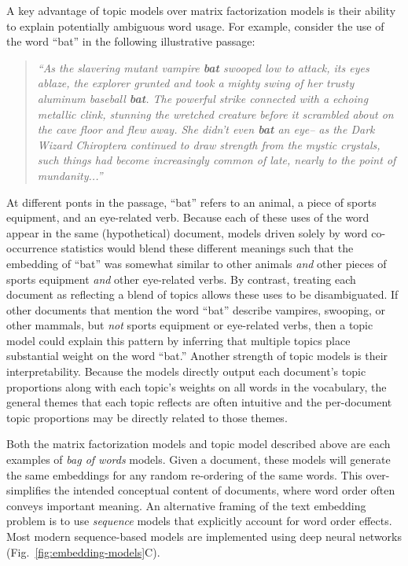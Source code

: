 \documentclass{article}
\begin{document}
A key advantage of topic models over matrix factorization models is their ability to explain potentially ambiguous word usage.  For example, consider the use of the word ``bat'' in the following illustrative passage:
\begin{quote}
  \textit{``As the slavering mutant vampire \textbf{bat} swooped low to attack, its eyes ablaze, the explorer grunted and took a mighty swing of her trusty aluminum baseball \textbf{bat}.  The powerful strike connected with a echoing metallic \textit{clink}, stunning the wretched creature before it scrambled about on the cave floor and flew away.  She didn't even \textbf{bat} an eye-- as the Dark Wizard Chiroptera continued to draw strength from the mystic crystals, such things had become increasingly common of late, nearly to the point of mundanity...''}
  \end{quote}
At different ponts in the passage, ``bat'' refers to an animal, a piece of sports equipment, and an eye-related verb.  Because each of these uses of the word appear in the same (hypothetical) document, models driven solely by word co-occurrence statistics would blend these different meanings such that the embedding of ``bat'' was somewhat similar to other animals \textit{and} other pieces of sports equipment \textit{and} other eye-related verbs.  By contrast, treating each document as reflecting a blend of topics allows these uses to be disambiguated.  If other documents that mention the word ``bat'' describe vampires, swooping, or other mammals, but \textit{not} sports equipment or eye-related verbs, then a topic model could explain this pattern by inferring that multiple topics place substantial weight on the word ``bat.''  Another strength of topic models is their interpretability.  Because the models directly output each document's topic proportions along with each topic's weights on all words in the vocabulary, the general themes that each topic reflects are often intuitive and the per-document topic proportions may be directly related to those themes.

Both the matrix factorization models and topic model described above are each examples of \textit{bag of words} models.  Given a document, these models will generate the same embeddings for any random re-ordering of the same words.  This over-simplifies the intended conceptual content of documents, where word order often conveys important meaning.  An alternative framing of the text embedding problem is to use \textit{sequence} models that explicitly account for word order effects.  Most modern sequence-based models are implemented using deep neural networks (Fig.~\ref{fig:embedding-models}C).
\end{document}
